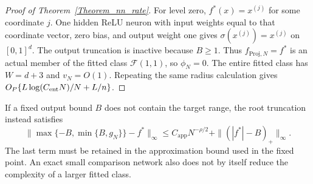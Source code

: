 \documentclass[twoside,11pt]{article}
\newenvironment{revision}{\color{revisionred}}{}
\begin{document}
\begin{revision}
\begin{proof}[Proof of Theorem~\ref{Theorem_nn_rate}]
For level zero, $f^*(x)=x^{(j)}$ for some coordinate $j$.
One hidden ReLU neuron with input weights equal to that
coordinate vector, zero bias, and output weight one gives
$\sigma(x^{(j)})=x^{(j)}$ on $[0,1]^d$.
The output truncation is inactive because $B\geq1$.
Thus $f_{\mathrm{Proj},N}=f^*$ is an actual member of the
fitted class $\mathcal F(1,1)$, so $\phi_N=0$.
The entire fitted class has $W=d+3$ and $v_N=O(1)$.
Repeating the same radius calculation gives
$O_P\{L\log(C_{\rm ent}N)/N+L/n\}$.
\end{proof}
\end{revision}

\begin{revision}
If a fixed output bound $B$ does not contain the target range,
the root truncation instead satisfies
\[
\|\max\{-B,\min\{B,g_N\}\}-f^*\|_\infty
\leq C_{\mathrm{app}}N^{-\rho/2}
       +\|(|f^*|-B)_+\|_\infty.
\]
The last term must be retained in the approximation bound
used in the fixed point. An exact small comparison network
also does not by itself reduce the complexity of a larger
fitted class.
\end{revision}











\end{document}

